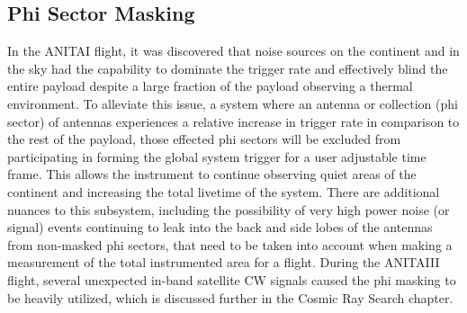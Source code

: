 	\subsection{Phi Sector Masking}
		In the ANITAI flight, it was discovered that noise sources on the continent and in the sky had the capability to dominate the trigger rate and effectively blind the entire payload despite a large fraction of the payload observing a thermal environment. To alleviate this issue, a system where an antenna or collection (phi sector) of antennas experiences a relative increase in trigger rate in comparison to the rest of the payload, those effected phi sectors will be excluded from participating in forming the global system trigger for a user adjustable time frame.  This allows the instrument to continue observing quiet areas of the continent and increasing the total livetime of the system.  There are additional nuances to this subsystem, including the possibility of very high power noise (or signal) events continuing to leak into the back and side lobes of the antennas from non-masked phi sectors, that need to be taken into account when making a measurement of the total instrumented area for a flight.  During the ANITAIII flight, several unexpected in-band satellite CW signals caused the phi masking to be heavily utilized, which is discussed further in the Cosmic Ray Search chapter.
		
		
		
		
